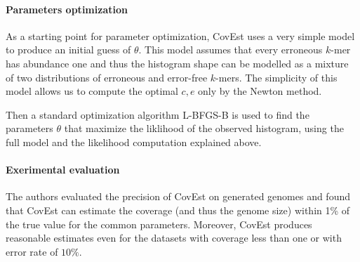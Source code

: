 \paragraph{Parameters optimization}
As a starting point for parameter optimization, CovEst uses a very simple model
to produce an initial guess of $\theta$. This model assumes that every
erroneous $k$-mer has abundance one and thus the histogram shape can be modelled
as a mixture of two distributions of erroneous and error-free $k$-mers. The
simplicity of this model allows us to compute the optimal $c, e$ only by the Newton method.

Then a standard optimization algorithm L-BFGS-B is used to find the parameters $\theta$
that maximize the liklihood of the observed histogram, using the full model and the
likelihood computation explained above.

\paragraph{Exerimental evaluation}
The authors evaluated the precision of CovEst on generated genomes \cite{Hozza2015}
and found that CovEst can estimate the coverage (and thus the genome size) within 1\% 
of the true value for the common parameters. Moreover, CovEst produces reasonable
estimates even for the datasets with coverage less than one or with error rate of $10\%$.
